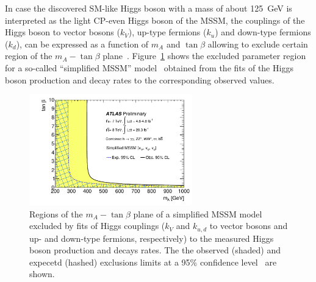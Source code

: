 In case the discovered SM-like Higgs boson with a mass of about 125~GeV is interpreted as the light CP-even Higgs boson of the MSSM, the couplings of the Higgs boson 
to vector bosons ($k_V$), up-type fermions ($k_u$) and down-type fermions ($k_d$), can be expressed as a function of  $m_A $ and $\tan\beta$
allowing to exclude certain region of the  $m_A - \tan\beta$ plane~\cite{AtlasConstraint}. Figure~\ref{fig:ex1} shows the 
excluded parameter region for a so-called ``simplified MSSM'' model~\cite{sympleMSSM1,sympleMSSM2}
obtained from the fits of the  Higgs boson production and decay rates to the corresponding observed values.

 
\begin{figure}[p]
     \begin{center}

            \includegraphics[width=0.63\textwidth]{figure/limits/constraintAtlas.pdf}

    \end{center}
    \caption{Regions of the  $m_A - \tan\beta$ plane of a simplified MSSM model~\cite{sympleMSSM1,sympleMSSM2} 
	excluded by fits of Higgs couplings ($k_V$ and $k_{u,d}$ to vector bosons and up- and down-type fermions, respectively)
	to the measured  Higgs boson production and decays rates. The the observed (shaded) and expecetd (hashed)  exclusions 
	limits at a 95\% confidence level~\cite{AtlasConstraint} are shown.}

   \label{fig:ex1}
\end{figure}

